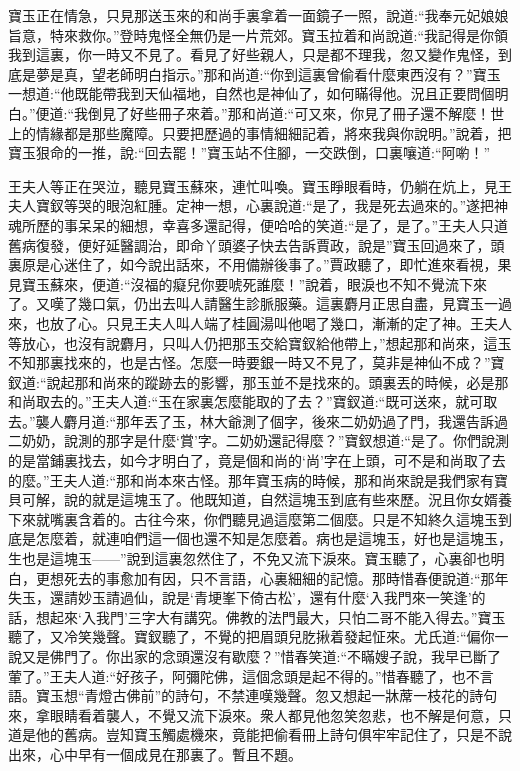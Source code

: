 \begin{parag}
    寶玉正在情急，只見那送玉來的和尚手裏拿着一面鏡子一照，說道:“我奉元妃娘娘旨意，特來救你。”登時鬼怪全無仍是一片荒郊。寶玉拉着和尚說道:“我記得是你領我到這裏，你一時又不見了。看見了好些親人，只是都不理我，忽又變作鬼怪，到底是夢是真，望老師明白指示。”那和尚道:“你到這裏曾偷看什麼東西沒有？”寶玉一想道:“他既能帶我到天仙福地，自然也是神仙了，如何瞞得他。況且正要問個明白。”便道:“我倒見了好些冊子來着。”那和尚道:“可又來，你見了冊子還不解麼！世上的情緣都是那些魔障。只要把歷過的事情細細記着，將來我與你說明。”說着，把寶玉狠命的一推，說:“回去罷！”寶玉站不住腳，一交跌倒，口裏嚷道:“阿喲！”
\end{parag}


\begin{parag}
    王夫人等正在哭泣，聽見寶玉蘇來，連忙叫喚。寶玉睜眼看時，仍躺在炕上，見王夫人寶釵等哭的眼泡紅腫。定神一想，心裏說道:“是了，我是死去過來的。”遂把神魂所歷的事呆呆的細想，幸喜多還記得，便哈哈的笑道:“是了，是了。”王夫人只道舊病復發，便好延醫調治，即命丫頭婆子快去告訴賈政，說是”寶玉回過來了，頭裏原是心迷住了，如今說出話來，不用備辦後事了。”賈政聽了，即忙進來看視，果見寶玉蘇來，便道:“沒福的癡兒你要唬死誰麼！”說着，眼淚也不知不覺流下來了。又嘆了幾口氣，仍出去叫人請醫生診脈服藥。這裏麝月正思自盡，見寶玉一過來，也放了心。只見王夫人叫人端了桂圓湯叫他喝了幾口，漸漸的定了神。王夫人等放心，也沒有說麝月，只叫人仍把那玉交給寶釵給他帶上，”想起那和尚來，這玉不知那裏找來的，也是古怪。怎麼一時要銀一時又不見了，莫非是神仙不成？”寶釵道:“說起那和尚來的蹤跡去的影響，那玉並不是找來的。頭裏丟的時候，必是那和尚取去的。”王夫人道:“玉在家裏怎麼能取的了去？”寶釵道:“既可送來，就可取去。”襲人麝月道:“那年丟了玉，林大爺測了個字，後來二奶奶過了門，我還告訴過二奶奶，說測的那字是什麼‘賞’字。二奶奶還記得麼？”寶釵想道:“是了。你們說測的是當鋪裏找去，如今才明白了，竟是個和尚的‘尚’字在上頭，可不是和尚取了去的麼。”王夫人道:“那和尚本來古怪。那年寶玉病的時候，那和尚來說是我們家有寶貝可解，說的就是這塊玉了。他既知道，自然這塊玉到底有些來歷。況且你女婿養下來就嘴裏含着的。古往今來，你們聽見過這麼第二個麼。只是不知終久這塊玉到底是怎麼着，就連咱們這一個也還不知是怎麼着。病也是這塊玉，好也是這塊玉，生也是這塊玉——”說到這裏忽然住了，不免又流下淚來。寶玉聽了，心裏卻也明白，更想死去的事愈加有因，只不言語，心裏細細的記憶。那時惜春便說道:“那年失玉，還請妙玉請過仙，說是‘青埂峯下倚古松’，還有什麼‘入我門來一笑逢’的話，想起來‘入我門’三字大有講究。佛教的法門最大，只怕二哥不能入得去。”寶玉聽了，又冷笑幾聲。寶釵聽了，不覺的把眉頭兒肐揪着發起怔來。尤氏道:“偏你一說又是佛門了。你出家的念頭還沒有歇麼？”惜春笑道:“不瞞嫂子說，我早已斷了葷了。”王夫人道:“好孩子，阿彌陀佛，這個念頭是起不得的。”惜春聽了，也不言語。寶玉想“青燈古佛前”的詩句，不禁連嘆幾聲。忽又想起一牀蓆一枝花的詩句來，拿眼睛看着襲人，不覺又流下淚來。衆人都見他忽笑忽悲，也不解是何意，只道是他的舊病。豈知寶玉觸處機來，竟能把偷看冊上詩句俱牢牢記住了，只是不說出來，心中早有一個成見在那裏了。暫且不題。
\end{parag}


